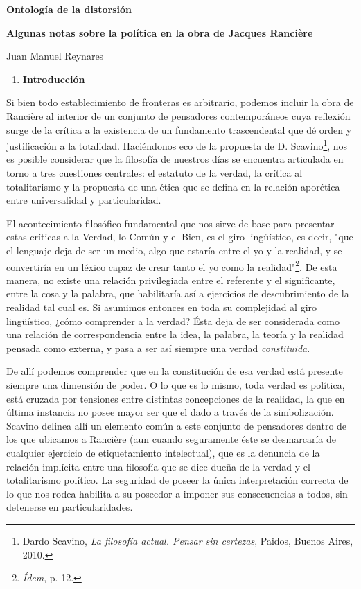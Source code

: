 \documentclass{book}
\begin{document}
\textbf{Ontología de la distorsión}

\textbf{Algunas notas sobre la política en la obra de Jacques Rancière}

Juan Manuel Reynares

\begin{enumerate}
\def\labelenumi{\arabic{enumi}.}
\item
  \textbf{Introducción}
\end{enumerate}

Si bien todo establecimiento de fronteras es arbitrario, podemos incluir
la obra de Rancière al interior de un conjunto de pensadores
contemporáneos cuya reflexión surge de la crítica a la existencia de un
fundamento trascendental que dé orden y justificación a la totalidad.
Haciéndonos eco de la propuesta de D. Scavino\footnote{Dardo Scavino,
  \emph{La filosofía actual. Pensar sin certezas}, Paidos, Buenos Aires,
  2010.}, nos es posible considerar que la filosofía de nuestros días se
encuentra articulada en torno a tres cuestiones centrales: el estatuto
de la verdad, la crítica al totalitarismo y la propuesta de una ética
que se defina en la relación aporética entre universalidad y
particularidad.

El acontecimiento filosófico fundamental que nos sirve de base para
presentar estas críticas a la Verdad, lo Común y el Bien, es el giro
lingüístico, es decir, "que el lenguaje deja de ser un medio, algo que
estaría entre el yo y la realidad, y se convertiría en un léxico capaz
de crear tanto el yo como la realidad"\footnote{\emph{Ídem}, p. 12.}. De
esta manera, no existe una relación privilegiada entre el referente y el
significante, entre la cosa y la palabra, que habilitaría así a
ejercicios de descubrimiento de la realidad tal cual es. Si asumimos
entonces en toda su complejidad al giro lingüístico, ¿cómo comprender a
la verdad? Ésta deja de ser considerada como una relación de
correspondencia entre la idea, la palabra, la teoría y la realidad
pensada como externa, y pasa a ser así siempre una verdad
\emph{constituida}.

De allí podemos comprender que en la constitución de esa verdad está
presente siempre una dimensión de poder. O lo que es lo mismo, toda
verdad es política, está cruzada por tensiones entre distintas
concepciones de la realidad, la que en última instancia no posee mayor
ser que el dado a través de la simbolización. Scavino delinea allí un
elemento común a este conjunto de pensadores dentro de los que ubicamos
a Rancière (aun cuando seguramente éste se desmarcaría de cualquier
ejercicio de etiquetamiento intelectual), que es la denuncia de la
relación implícita entre una filosofía que se dice dueña de la verdad y
el totalitarismo político. La seguridad de poseer la única
interpretación correcta de lo que nos rodea habilita a su poseedor a
imponer sus consecuencias a todos, sin detenerse en particularidades.
\end{document}
